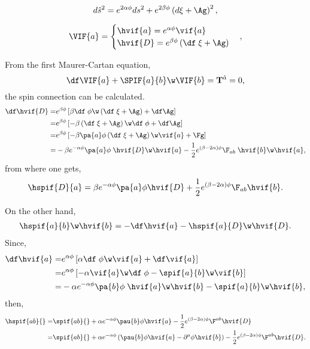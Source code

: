 \begin{equation}
  d\hat{s}^2 = e^{2\alpha\phi}ds^2 + e^{2\beta\phi}\left(d\xi + \Ag\right)^2,
\end{equation}

\begin{equation}
\VIF{a} = 
\begin{cases}
  \hvif{a} = e^{\alpha\phi} \vif{a}\\
  \hvif{D} = e^{\beta\phi}\left(\df\;\xi +\Ag \right)
\end{cases},
\end{equation}

From the first Maurer-Cartan equation,
\begin{equation}
  \df\VIF{a} + \SPIF{a}{b}\w\VIF{b} = {\bf{T}}^{\hat{a}} = 0,
\end{equation}
the spin connection can be calculated.
\begin{align}
  \df\hvif{D} =& e^{\beta\phi}\left[\beta\df\;\phi\w\left(\df\;\xi +\Ag \right) + \df\Ag\right]\nonumber\\
  =& e^{\beta\phi}\left[-\beta\left(\df\;\xi +\Ag \right)\w\df\;\phi + \df\Ag\right]\nonumber\\
  =& e^{\beta\phi}\left[-\beta\pa{a}\phi\left(\df\;\xi +\Ag \right)\w\vif{a} + \Fg\right]\nonumber\\
 =& -\beta e^{-\alpha\phi}\pa{a}\phi\;\hvif{D}\w\hvif{a} -\frac{1}{2}e^{(\beta-2\alpha)\phi}\F_{a b}\;\hvif{b}\w\hvif{a},
\end{align}
from where one gets,
\begin{align}
  \hspif{D}{a} = \beta e^{-\alpha\phi}\pa{a}\phi\hvif{D} + \frac{1}{2}e^{(\beta-2\alpha)\phi}\F_{a b}\hvif{b}.
\end{align}

On the other hand,
\begin{align}
  \hspif{a}{b}\w\hvif{b} = -\df\hvif{a} - \hspif{a}{D}\w\hvif{D}.
\end{align}
Since,
\begin{align}
  \df\hvif{a} 
  =& e^{\alpha\phi}\left[\alpha\df\;\phi\w\vif{a} +  \df\vif{a}\right]\nonumber\\
  =& e^{\alpha\phi}\left[-\alpha\vif{a}\w\df\;\phi -  \spif{a}{b}\w\vif{b}\right]\nonumber\\
  =& -\alpha e^{-\alpha\phi}\pa{b}\phi\;\hvif{a}\w\hvif{b} - \spif{a}{b}\w\hvif{b},
\end{align}
then,
\begin{align}
  \hspif{ab}{} =& \spif{ab}{} + \alpha e^{-\alpha\phi}\pau{b}\phi\hvif{a} - \frac{1}{2}e^{(\beta-2\alpha)\phi}\F^{a b}\hvif{D}\nonumber\\
  =& \spif{ab}{} + \alpha e^{-\alpha\phi}\left(\pau{b}\phi\hvif{a} - \partial^{a}\phi\hvif{b}\right) - \frac{1}{2}e^{(\beta-2\alpha)\phi}\F^{a b}\hvif{D}.
\end{align}

